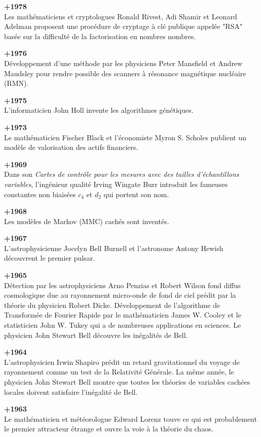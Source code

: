\textbf{+1978}\\
Les mathématiciens et cryptologues Ronald Rivest, Adi Shamir et Leonard Adelman proposent une procédure de cryptage à clé publique appelée "RSA" basée sur la difficulté de la factorisation en nombres nombres.

\textbf{+1976}\\
Développement d'une méthode par les physiciens Peter Mansfield et Andrew Maudsley pour rendre possible des scanners à résonance magnétique nucléaire (RMN).

\textbf{+1975}\\
L'informaticien John Holl invente les algorithmes génétiques.

\textbf{+1973}\\
Le mathématicien Fischer Black et l'économiste Myron S. Scholes publient un modèle de valorisation des actifs financiers.

\textbf{+1969}\\
Dans son \textit{Cartes de contrôle pour les mesures avec des tailles d'échantillons variables}, l'ingénieur qualité Irving Wingate Burr introduit les fameuses constantes non biaisées $c_4$ et $d_2$ qui portent son nom.

\textbf{+1968}\\
Les modèles de Markov (MMC) cachés sont inventés.

\textbf{+1967}\\
L'astrophysicienne Jocelyn Bell Burnell et l'astronome Antony Hewish découvrent le premier pulsar.

\textbf{+1965}\\
Détection par les astrophysiciens Arno Penzias et Robert Wilson fond diffus cosmologique due au rayonnement micro-onde de fond de ciel prédit par la théorie du physicien Robert Dicke. Développement de l'algorithme de Transformée de Fourier Rapide par le mathématicien James W. Cooley et le statisticien John W. Tukey qui a de nombreuses applications en sciences. Le physicien John Stewart Bell découvre les inégalités de Bell.

\textbf{+1964}\\
L'astrophysicien Irwin Shapiro prédit un retard gravitationnel du voyage de rayonnement comme un test de la Relativité Générale. La même année, le physicien John Stewart Bell montre que toutes les théories de variables cachées locales doivent satisfaire l'inégalité de Bell.

\textbf{+1963}\\
Le mathématicien et météorologue Edward Lorenz touve ce qui est probablement le premier attracteur étrange et ouvre la voie à la théorie du chaos.

